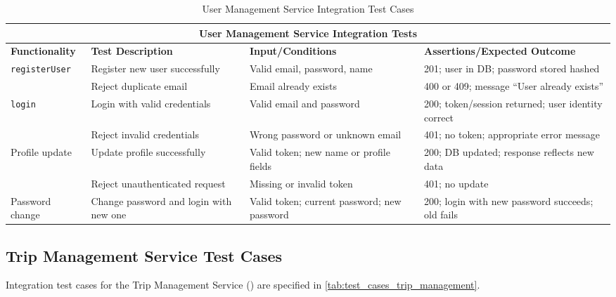 \begin{table}[ht]
\centering
\begin{tabular}{|p{3.2cm}|p{3.8cm}|p{3.2cm}|p{4.8cm}|}
\hline
\multicolumn{4}{|c|}{\textbf{User Management Service Integration Tests}} \\ 
\hline
\textbf{Functionality} & \textbf{Test Description} & \textbf{Input/Conditions} & \textbf{Assertions/Expected Outcome} \\
\hline
\multirow{2}{*}{\texttt{registerUser}}
 & Register new user successfully
 & Valid email, password, name
 & 201; user in DB; password stored hashed \\ \cline{2-4}
 & Reject duplicate email
 & Email already exists
 & 400 or 409; message ``User already exists'' \\
\hline
\multirow{2}{*}{\texttt{login}}
 & Login with valid credentials
 & Valid email and password
 & 200; token/session returned; user identity correct \\ \cline{2-4}
 & Reject invalid credentials
 & Wrong password or unknown email
 & 401; no token; appropriate error message \\
\hline
\multirow{2}{*}{Profile update}
 & Update profile successfully
 & Valid token; new name or profile fields
 & 200; DB updated; response reflects new data \\ \cline{2-4}
 & Reject unauthenticated request
 & Missing or invalid token
 & 401; no update \\
\hline
Password change
 & Change password and login with new one
 & Valid token; current password; new password
 & 200; login with new password succeeds; old fails \\
\hline
\end{tabular}
\caption{User Management Service Integration Test Cases}
\label{tab:test_cases_user_management}
\end{table}

\subsection{Trip Management Service Test Cases}
\label{subsec:trip_management_service_test_cases}%

Integration test cases for the Trip Management Service () are specified in \cref{tab:test_cases_trip_management}.

